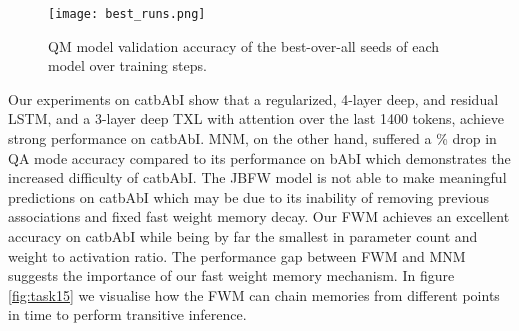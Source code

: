 \documentclass{article} \usepackage{iclr2021_conference,times}
\begin{document}
\begin{figure}[!ht]
  \centering
  \vspace{-3pt}
  \texttt{[image: best\_runs.png]}
  \vspace{-10pt}
  \caption{
  QM model validation accuracy of the best-over-all seeds of each model over training steps.}
  \vspace{-3pt}
  \label{fig:bestRuns}
\end{figure}

Our experiments on catbAbI show that a regularized, 4-layer deep, and residual LSTM, and a 3-layer deep TXL with attention over the last 1400 tokens, achieve strong performance on catbAbI. 
MNM, on the other hand, suffered a \% drop in QA mode accuracy compared to its performance on bAbI which demonstrates the increased difficulty of catbAbI. 
The JBFW model is not able to make meaningful predictions on catbAbI which may be due to its inability of removing previous associations and fixed fast weight memory decay.
Our FWM achieves an excellent accuracy on catbAbI while being by far the smallest in parameter count and weight to activation ratio. 
The performance gap between FWM and MNM suggests the importance of our fast weight memory mechanism.
In figure \ref{fig:task15} we visualise how the FWM can chain memories from different points in time to perform transitive inference.
\end{document}

